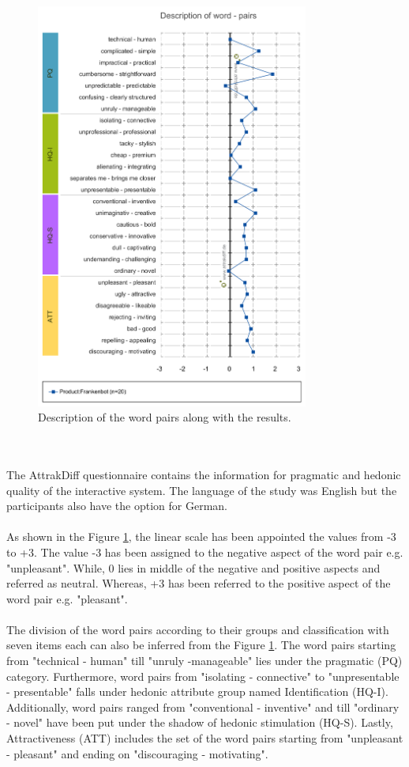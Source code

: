 \begin{figure}[!h]
    \centering
    \includegraphics[width=0.8\textwidth]{img/Description_of_word_pairs.png}
    \caption{Description of the word pairs along with the results.}
    \label{fig:descofWordPair}
\end{figure}
\\~\\
The AttrakDiff questionnaire contains the information for pragmatic and hedonic quality of the interactive system. The language of the study was English but the participants also have the option for German.
\\~\\
As shown in the Figure \ref{fig:descofWordPair}, the linear scale has been appointed the values from -3 to +3. The value -3 has been assigned to the negative aspect of the word pair e.g. "unpleasant". While, 0 lies in middle of the negative and positive aspects and referred as neutral. Whereas, +3 has been referred to the positive aspect of the word pair e.g. "pleasant".
\\~\\
The division of the word pairs according to their groups and classification with seven items each can also be inferred from the Figure \ref{fig:descofWordPair}. The word pairs starting from "technical - human" till "unruly -manageable" lies under the pragmatic (PQ) category. Furthermore, word pairs from "isolating - connective" to "unpresentable - presentable" falls under hedonic attribute group named Identification (HQ-I). Additionally, word pairs ranged from "conventional - inventive" and till "ordinary - novel" have been put under the shadow of hedonic stimulation (HQ-S). Lastly, Attractiveness (ATT) includes the set of the word pairs starting from "unpleasant - pleasant" and ending on "discouraging - motivating". 
